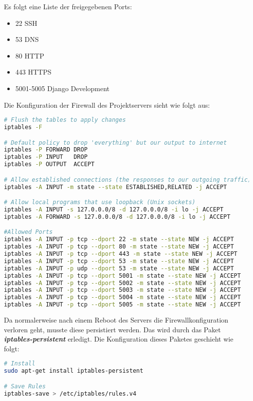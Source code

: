 Es folgt eine Liste der freigegebenen Ports:
\begin{itemize}
\item 22	SSH
\item 53	\gls{DNS}
\item 80	\gls{HTTP}
\item 443	\gls{HTTPS}
\item 5001-5005 Django Development
\end{itemize}

\newpage

Die Konfiguration der Firewall des Projektservers sieht wie folgt aus:
\begin{lstlisting}[caption = Firewall Rules des Projektservers, label = firewall1, language=bash]
# Flush the tables to apply changes
iptables -F

# Default policy to drop 'everything' but our output to internet
iptables -P FORWARD DROP
iptables -P INPUT   DROP
iptables -P OUTPUT  ACCEPT

# Allow established connections (the responses to our outgoing traffic)
iptables -A INPUT -m state --state ESTABLISHED,RELATED -j ACCEPT

# Allow local programs that use loopback (Unix sockets)
iptables -A INPUT -s 127.0.0.0/8 -d 127.0.0.0/8 -i lo -j ACCEPT
iptables -A FORWARD -s 127.0.0.0/8 -d 127.0.0.0/8 -i lo -j ACCEPT

#Allowed Ports
iptables -A INPUT -p tcp --dport 22 -m state --state NEW -j ACCEPT
iptables -A INPUT -p tcp --dport 80 -m state --state NEW -j ACCEPT
iptables -A INPUT -p tcp --dport 443 -m state --state NEW -j ACCEPT
iptables -A INPUT -p tcp --dport 53 -m state --state NEW -j ACCEPT
iptables -A INPUT -p udp --dport 53 -m state --state NEW -j ACCEPT
iptables -A INPUT -p tcp --dport 5001 -m state --state NEW -j ACCEPT
iptables -A INPUT -p tcp --dport 5002 -m state --state NEW -j ACCEPT
iptables -A INPUT -p tcp --dport 5003 -m state --state NEW -j ACCEPT
iptables -A INPUT -p tcp --dport 5004 -m state --state NEW -j ACCEPT
iptables -A INPUT -p tcp --dport 5005 -m state --state NEW -j ACCEPT
\end{lstlisting}

Da normalerweise nach einem Reboot des Servers die Firewallkonfiguration verloren geht, musste diese persistiert werden. Das wird durch das Paket \textbf{\textit{iptables-persistent}} erledigt. Die Konfiguration dieses Paketes geschieht wie folgt\cite{FIREWALL_PERSISTENT}:

\begin{lstlisting}[caption = Installation iptables-persistent, label = firewall2, language=bash]
# Install
sudo apt-get install iptables-persistent

# Save Rules
iptables-save > /etc/iptables/rules.v4
\end{lstlisting}

